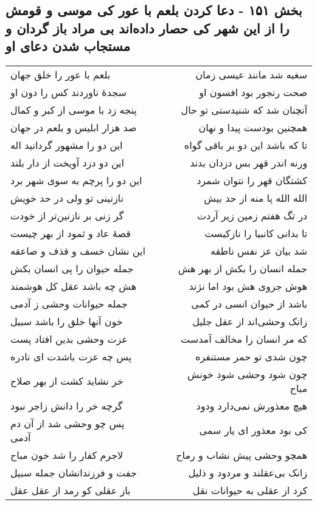 \begin{center}
\section*{بخش ۱۵۱ - دعا کردن بلعم با عور کی موسی و قومش را از این شهر کی حصار داده‌اند بی مراد باز گردان و مستجاب شدن دعای او}
\label{sec:sh151}
\begin{longtable}{l p{0.5cm} r}
بلعم با عور را خلق جهان
&&
سغبه شد مانند عیسی زمان
\\
سجدهٔ ناوردند کس را دون او
&&
صحت رنجور بود افسون او
\\
پنجه زد با موسی از کبر و کمال
&&
آنچنان شد که شنیدستی تو حال
\\
صد هزار ابلیس و بلعم در جهان
&&
همچنین بودست پیدا و نهان
\\
این دو را مشهور گردانید اله
&&
تا که باشد این دو بر باقی گواه
\\
این دو دزد آویخت از دار بلند
&&
ورنه اندر قهر بس دزدان بدند
\\
این دو را پرچم به سوی شهر برد
&&
کشتگان قهر را نتوان شمرد
\\
نازنینی تو ولی در حد خویش
&&
الله الله پا منه از حد بیش
\\
گر زنی بر نازنین‌تر از خودت
&&
در تگ هفتم زمین زیر آردت
\\
قصهٔ عاد و ثمود از بهر چیست
&&
تا بدانی کانبیا را نازکیست
\\
این نشان خسف و قذف و صاعقه
&&
شد بیان عز نفس ناطقه
\\
جمله حیوان را پی انسان بکش
&&
جمله انسان را بکش از بهر هش
\\
هش چه باشد عقل کل هوشمند
&&
هوش جزوی هش بود اما نژند
\\
جمله حیوانات وحشی ز آدمی
&&
باشد از حیوان انسی در کمی
\\
خون آنها خلق را باشد سبیل
&&
زانک وحشی‌اند از عقل جلیل
\\
عزت وحشی بدین افتاد پست
&&
که مر انسان را مخالف آمدست
\\
پس چه عزت باشدت ای نادره
&&
چون شدی تو حمر مستنفره
\\
خر نشاید کشت از بهر صلاح
&&
چون شود وحشی شود خونش مباح
\\
گرچه خر را دانش زاجر نبود
&&
هیچ معذورش نمی‌دارد ودود
\\
پس چو وحشی شد از آن دم آدمی
&&
کی بود معذور ای یار سمی
\\
لاجرم کفار را شد خون مباح
&&
همچو وحشی پیش نشاب و رماح
\\
جفت و فرزندانشان جمله سبیل
&&
زانک بی‌عقلند و مردود و ذلیل
\\
باز عقلی کو رمد از عقل عقل
&&
کرد از عقلی به حیوانات نقل
\\
\end{longtable}
\end{center}
